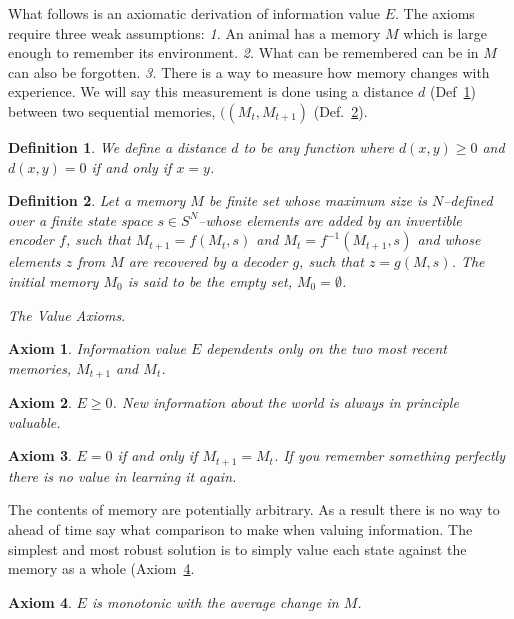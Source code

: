 \documentclass[9pt,twocolumn,twoside]{pnas-new}
\newtheorem{axiom}{Axiom}
\newtheorem{definition}{Definition}
\begin{document}
What follows is an axiomatic derivation of information value $E$. The axioms require three weak assumptions: \textit{1.} An animal has a memory $M$ which is large enough to remember its environment. \textit{2.} What can be remembered can be in $M$ can also be forgotten. \textit{3.} There is a way to measure how memory changes with experience. We will say this measurement is done using a distance $d$ (Def~\ref{def:distance}) between two sequential memories, $((M_{t}, M_{t+1})$ (Def.~\ref{def:memory}). 

\begin{definition}
    \label{def:distance}
    We define a distance $d$ to be any function where $d(x,y) \geq 0$ and $d(x,y) = 0$ if and only if $x = y$.
\end{definition}

\begin{definition}
    \label{def:memory}
    Let a memory $M$ be finite set whose maximum size is $N$--defined over a finite state space $s \in S^N$--whose elements are added by an invertible encoder $f$, such that $M_{t+1} = f(M_{t}, s)$ and $M_{t} = f^{-1}(M_{t+1}, s)$ and whose elements $z$ from $M$ are recovered by a decoder $g$, such that $z = g(M, s)$. The initial memory $M_{0}$ is said to be the empty set, $M_{0} = \emptyset$.
\end{definition}

\center \textit{The Value Axioms}.
\begin{axiom} 
    Information value $E$ dependents only on the two most recent memories, $M_{t+1}$ and $M_{t}$.
    \label{ax:1}
\end{axiom} 

\begin{axiom}
    $E \geq 0$. New information about the world is always \textit{in principle} valuable.
    \label{ax:2}
\end{axiom}

\begin{axiom}
    $E = 0$ if and only if $M_{t+1} = M_{t}$. If you remember something perfectly there is no value in learning it again. 
    \label{ax:3}
\end{axiom}

\noindent
The contents of memory are potentially arbitrary. As a result there is no way to ahead of time say what comparison to make when valuing information. The simplest and most robust solution is to simply value each state against the memory as a whole (Axiom~\ref{ax:4}. 
\begin{axiom}
    $E$ is monotonic with the average change in $M$.
    \label{ax:4}
\end{axiom}
\end{document}
